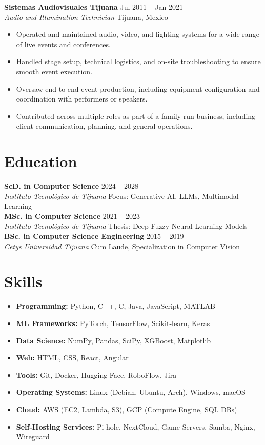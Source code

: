 \documentclass[letterpaper,11pt]{article}
\newcommand{\resumeItem}[1]{\item{\small{#1}}}
\newcommand{\resumeSubheading}[4]{
  \vspace{1pt}\textbf{#1} \hfill #2\\
  {\emph{#3}} \hfill {\small #4}\\
}
\begin{document}
\resumeSubheading{Sistemas Audiovisuales Tijuana}{Jul 2011 -- Jan 2021}{Audio and Illumination Technician}{Tijuana, Mexico}
\begin{itemize}[leftmargin=0.15in]
  \resumeItem{Operated and maintained audio, video, and lighting systems for a wide range of live events and conferences.}
  \resumeItem{Handled stage setup, technical logistics, and on-site troubleshooting to ensure smooth event execution.}
  \resumeItem{Oversaw end-to-end event production, including equipment configuration and coordination with performers or speakers.}
  \resumeItem{Contributed across multiple roles as part of a family-run business, including client communication, planning, and general operations.}
\end{itemize}

\section*{Education}
\resumeSubheading{ScD. in Computer Science}{2024 -- 2028}{Instituto Tecnológico de Tijuana}{Focus: Generative AI, LLMs, Multimodal Learning}
\resumeSubheading{MSc. in Computer Science}{2021 -- 2023}{Instituto Tecnológico de Tijuana}{Thesis: Deep Fuzzy Neural Learning Models}
\resumeSubheading{BSc. in Computer Science Engineering}{2015 -- 2019}{Cetys Universidad Tijuana}{Cum Laude, Specialization in Computer Vision}

\section*{Skills}
\begin{itemize}[leftmargin=0.15in, itemsep=2pt]
  \item \textbf{Programming:} Python, C++, C, Java, JavaScript, MATLAB
  \item \textbf{ML Frameworks:} PyTorch, TensorFlow, Scikit-learn, Keras
  \item \textbf{Data Science:} NumPy, Pandas, SciPy, XGBoost, Matplotlib
  \item \textbf{Web:} HTML, CSS, React, Angular
  \item \textbf{Tools:} Git, Docker, Hugging Face, RoboFlow, Jira
  \item \textbf{Operating Systems:} Linux (Debian, Ubuntu, Arch), Windows, macOS
  \item \textbf{Cloud:} AWS (EC2, Lambda, S3), GCP (Compute Engine, SQL DBs)
  \item \textbf{Self-Hosting Services:} Pi-hole, NextCloud, Game Servers, Samba, Nginx, Wireguard
\end{itemize}
\end{document}
